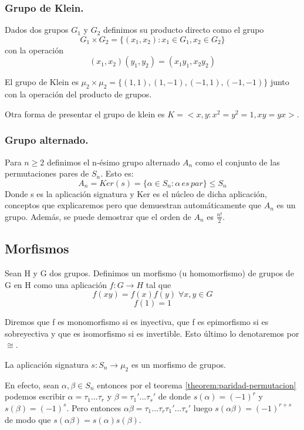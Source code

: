 \subsubsection{Grupo de Klein.}

\begin{ndef}
Dados dos grupos $G_1$ y $G_2$ definimos su producto directo como el grupo $$G_1 \times G_2 = \{(x_1,x_2):x_1 \in G_1,x_2 \in G_2\}$$ con la operación $$(x_1,x_2)(y_1,y_2) = (x_1y_1,x_2y_2)$$
\end{ndef}

El grupo de Klein es $\mu_2 \times \mu_2 = \{(1,1),(1,-1),(-1,1),(-1,-1)\}$ junto con la operación del producto de grupos.

Otra forma de presentar el grupo de klein es $K = <x,y : x^2 = y^2 = 1, xy = yx>$.

\subsubsection{Grupo alternado.}

Para $n \ge 2$ definimos el n-ésimo grupo alternado $A_n$ como el conjunto de las permutaciones pares de $S_n$. Esto es: $$A_n = Ker(s) = \{\alpha \in S_n : \alpha \, es \, par\} \le S_n$$ Donde s es la aplicación signatura y Ker es el núcleo de dicha aplicación, conceptos que explicaremos pero que demuestran automáticamente que $A_n$ es un grupo. Además, se puede demostrar que el orden de $A_n$ es $\frac{n!}{2}$.

\subsection{Morfismos}

\begin{ndef}
Sean H y G dos grupos. Definimos un morfismo (u homomorfismo) de grupos de G en H como una aplicación $f:G \rightarrow H$ tal que $$f(xy) = f(x)f(y) \; \forall x,y \in G$$
$$ f(1) = 1$$

Diremos que f es monomorfismo si es inyectiva, que f es epimorfismo si es sobreyectiva y que es isomorfismo si es invertible. Esto último lo denotaremos por $\cong$.
\end{ndef}

\begin{ejemplo}
La aplicación signatura $s:S_n \rightarrow \mu_2$ es un morfismo de grupos.

En efecto, sean $\alpha,\beta \in S_n$ entonces por el teorema \ref{theorem:paridad-permutacion} podemos escribir $\alpha = \tau_1...\tau_r$ y $\beta = \tau_1'...\tau_s'$ de donde $s(\alpha) = (-1)^r$ y $s(\beta) = (-1)^s$. Pero entonces $\alpha\beta = \tau_1...\tau_r\tau_1'...\tau_s'$ luego $s(\alpha\beta) = (-1)^{r+s}$ de modo que $s(\alpha\beta) = s(\alpha)s(\beta)$.
\end{ejemplo}

